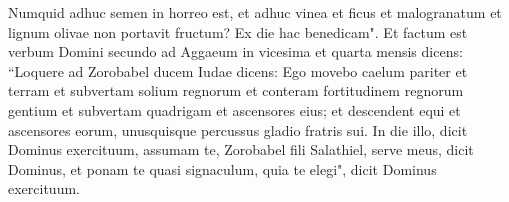 \begin{biblechapter}
\verse Numquid adhuc semen in horreo est, et adhuc vinea et ficus et malogranatum et lignum olivae non portavit fructum? Ex die hac benedicam". 
\verse Et factum est verbum Domini secundo ad Aggaeum in vicesima et quarta mensis dicens: 
\verse “Loquere ad Zorobabel ducem Iudae dicens: Ego movebo caelum pariter et terram 
\verse et subvertam solium regnorum et conteram fortitudinem regnorum gentium et subvertam quadrigam et ascensores eius; et descendent equi et ascensores eorum, unusquisque percussus gladio fratris sui. 
\verse In die illo, dicit Dominus exercituum, assumam te, Zorobabel fili Salathiel, serve meus, dicit Dominus, et ponam te quasi signaculum, quia te elegi", dicit Dominus exercituum.    
\end{biblechapter}
